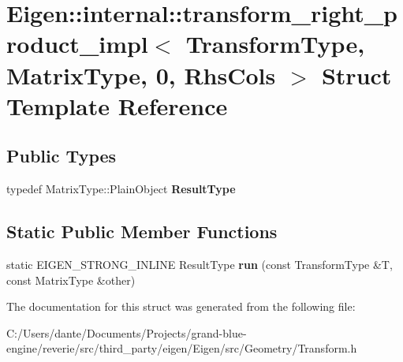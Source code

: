 \hypertarget{struct_eigen_1_1internal_1_1transform__right__product__impl_3_01_transform_type_00_01_matrix_type_00_010_00_01_rhs_cols_01_4}{}\section{Eigen\+::internal\+::transform\+\_\+right\+\_\+product\+\_\+impl$<$ Transform\+Type, Matrix\+Type, 0, Rhs\+Cols $>$ Struct Template Reference}
\label{struct_eigen_1_1internal_1_1transform__right__product__impl_3_01_transform_type_00_01_matrix_type_00_010_00_01_rhs_cols_01_4}
\subsection*{Public Types}
\begin{DoxyCompactItemize}
\item 
\mbox{\label{struct_eigen_1_1internal_1_1transform__right__product__impl_3_01_transform_type_00_01_matrix_type_00_010_00_01_rhs_cols_01_4_ac10dcf24f6329a4468e73a3db5af1798}} 
typedef Matrix\+Type\+::\+Plain\+Object {\bfseries Result\+Type}
\end{DoxyCompactItemize}
\subsection*{Static Public Member Functions}
\begin{DoxyCompactItemize}
\item 
\mbox{\label{struct_eigen_1_1internal_1_1transform__right__product__impl_3_01_transform_type_00_01_matrix_type_00_010_00_01_rhs_cols_01_4_a262c9cb7c69f651ee2f17a5c66328d99}} 
static E\+I\+G\+E\+N\+\_\+\+S\+T\+R\+O\+N\+G\+\_\+\+I\+N\+L\+I\+NE Result\+Type {\bfseries run} (const Transform\+Type \&T, const Matrix\+Type \&other)
\end{DoxyCompactItemize}


The documentation for this struct was generated from the following file\+:\begin{DoxyCompactItemize}
\item 
C\+:/\+Users/dante/\+Documents/\+Projects/grand-\/blue-\/engine/reverie/src/third\+\_\+party/eigen/\+Eigen/src/\+Geometry/Transform.\+h\end{DoxyCompactItemize}

